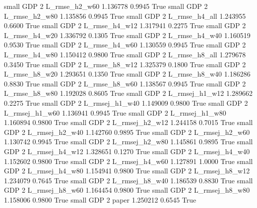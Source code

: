      small      GDP                 2  L_rmse_h2_w60   1.136778      0.9945    True
     small      GDP                 2  L_rmse_h2_w80   1.135856      0.9945    True
     small      GDP                 2  L_rmse_h4_all   1.243955      0.6600    True
     small      GDP                 2  L_rmse_h4_w12   1.317941      0.2275    True
     small      GDP                 2  L_rmse_h4_w20   1.336792      0.1305    True
     small      GDP                 2  L_rmse_h4_w40   1.160519      0.9530    True
     small      GDP                 2  L_rmse_h4_w60   1.130559      0.9945    True
     small      GDP                 2  L_rmse_h4_w80   1.150412      0.9800    True
     small      GDP                 2  L_rmse_h8_all   1.279678      0.3450    True
     small      GDP                 2  L_rmse_h8_w12   1.325379      0.1800    True
     small      GDP                 2  L_rmse_h8_w20   1.293651      0.1350    True
     small      GDP                 2  L_rmse_h8_w40   1.186286      0.8830    True
     small      GDP                 2  L_rmse_h8_w60   1.138567      0.9945    True
     small      GDP                 2  L_rmse_h8_w80   1.192028      0.8605    True
     small      GDP                 2 L_rmsej_h1_w12   1.289662      0.2275    True
     small      GDP                 2 L_rmsej_h1_w40   1.149009      0.9800    True
     small      GDP                 2 L_rmsej_h1_w60   1.136941      0.9945    True
     small      GDP                 2 L_rmsej_h1_w80   1.160894      0.9800    True
     small      GDP                 2 L_rmsej_h2_w12   1.244158      0.7015    True
     small      GDP                 2 L_rmsej_h2_w40   1.142760      0.9895    True
     small      GDP                 2 L_rmsej_h2_w60   1.130742      0.9945    True
     small      GDP                 2 L_rmsej_h2_w80   1.145861      0.9895    True
     small      GDP                 2 L_rmsej_h4_w12   1.328651      0.1270    True
     small      GDP                 2 L_rmsej_h4_w40   1.152602      0.9800    True
     small      GDP                 2 L_rmsej_h4_w60   1.127891      1.0000    True
     small      GDP                 2 L_rmsej_h4_w80   1.154941      0.9800    True
     small      GDP                 2 L_rmsej_h8_w12   1.234079      0.7645    True
     small      GDP                 2 L_rmsej_h8_w40   1.186539      0.8830    True
     small      GDP                 2 L_rmsej_h8_w60   1.164454      0.9800    True
     small      GDP                 2 L_rmsej_h8_w80   1.158006      0.9800    True
     small      GDP                 2          paper   1.250212      0.6545    True
